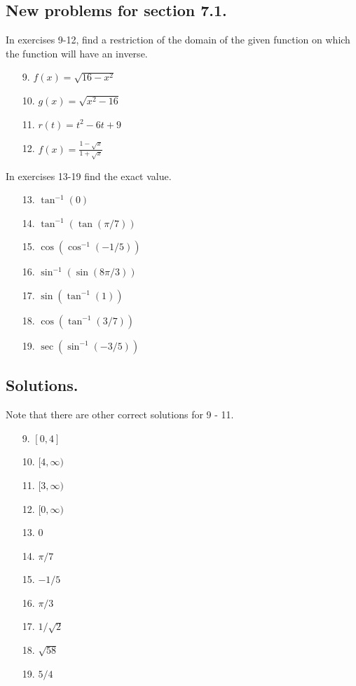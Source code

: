 \documentclass[12pt]{report}
\begin{document}
\subsection*{New problems for section 7.1.}

In exercises 9-12, find a restriction of the domain of the given function on which the function will have an inverse.

\begin{itemize}
\item[9.] $f(x)=\sqrt{16-x^2}$
\item[10.] $g(x)=\sqrt{x^2-16}$
\item[11.] $r(t)=t^2-6t+9$
\item[12.] $f(x)=\frac{1-\sqrt x}{1+\sqrt x}$
\end{itemize}

\medbreak\noindent 
In exercises 13-19 find the exact value.

\begin{itemize}
\item[13.] $\tan^{-1}(0)$
\item[14.] $\tan^{-1}(\tan(\pi/7))$
\item[15.] $\cos(\cos^{-1}(-1/5))$
\item[16.] $\sin^{-1}(\sin(8\pi/3))$
\item[17.] $\sin(\tan^{-1}(1))$
\item[18.] $\cos(\tan^{-1}(3/7))$
\item[19.] $\sec(\sin^{-1}(-3/5))$
\end{itemize}

\subsection*{Solutions.} Note that there are other correct solutions for 9 - 11.

\begin{itemize}
\item[9.] $[0,4]$
\item[10.] $[4,\infty)$
\item[11.] $[3,\infty)$
\item[12.] $[0,\infty)$ 
\item[13.] $0$
\item[14.] $\pi/7$
\item[15.] $-1/5$
\item[16.] $\pi/3$
\item[17.] $1/\sqrt 2$
\item[18.] $\sqrt{58}$
\item[19.] $5/4$
\end{itemize}
\end{document}
